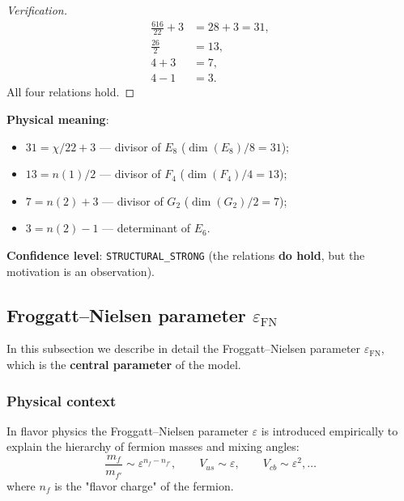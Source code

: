 \documentclass[11pt,a4paper]{article}
\newcommand{\epsFN}{\ensuremath{\varepsilon_{\text{FN}}}}
\theoremstyle{definition}
\begin{document}
\begin{proof}[Verification]
\begin{align}
    \frac{616}{22} + 3 &= 28 + 3 = 31, \\
    \frac{26}{2} &= 13, \\
    4 + 3 &= 7, \\
    4 - 1 &= 3.
\end{align}
All four relations hold.
\end{proof}

\medskip\noindent
\textbf{Physical meaning}:
\begin{itemize}
    \item $31 = \chi/22 + 3$ --- divisor of $E_8$ ($\dim(E_8)/8 = 31$);
    \item $13 = n(1)/2$ --- divisor of $F_4$ ($\dim(F_4)/4 = 13$);
    \item $7 = n(2) + 3$ --- divisor of $G_2$ ($\dim(G_2)/2 = 7$);
    \item $3 = n(2) - 1$ --- determinant of $E_6$.
\end{itemize}

\medskip\noindent
\textbf{Confidence level}: \texttt{STRUCTURAL\_STRONG}
(the relations \textbf{do hold}, but the motivation is an observation).

\subsection{Froggatt--Nielsen parameter \texorpdfstring{$\epsFN$}{epsilon\_FN}}
\label{subsec:eps-fn}

In this subsection we describe in detail the Froggatt--Nielsen
parameter $\epsFN$, which is the \textbf{central parameter} of the model.

\subsubsection{Physical context}

In flavor physics the Froggatt--Nielsen parameter $\varepsilon$ is introduced
empirically to explain the hierarchy of fermion masses and mixing
angles:
\begin{equation}
    \frac{m_f}{m_{f'}} \sim \varepsilon^{n_f - n_{f'}}, \qquad
    V_{us} \sim \varepsilon, \qquad V_{cb} \sim \varepsilon^2, \ldots
\end{equation}
where $n_f$ is the "flavor charge" of the fermion.
\end{document}
